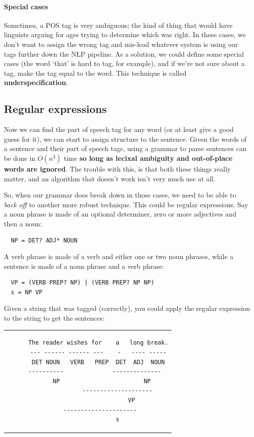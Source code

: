 \paragraph{Special cases} Sometimes, a POS tag is very ambiguous; the kind of
thing that would have linguists arguing for ages trying to determine which was
right. In these cases, we don't want to assign the wrong tag and mis-lead
whatever system is using our tags further down the NLP pipeline. As a solution,
we could define some special cases (the word `that' is hard to tag, for
example), and if we're not sure about a tag, make the tag equal to the word.
This technique is called \textbf{underspecification}.

\subsection{Regular expressions}

Now we can find the part of speech tag for any word (or at least give a good
guess for it), we can start to assign structure to the sentence. Given the words
of a sentence and their part of speech tags, using a grammar to parse sentences
can be done in $O(n^3)$ time \textbf{so long as lecixal ambiguity and
out-of-place words are ignored}. The trouble with this, is that both these
things really matter, and an algorithm that doesn't work isn't very much use
at all.

So, when our grammar does break down in those cases, we need to be able to
\textit{back off} to another more robust technique. This could be regular
expressions. Say a noun phrase is made of an optional determiner, zero or more
adjectives and then a noun:

\begin{verbatim}
  NP = DET? ADJ* NOUN
\end{verbatim}

A verb phrase is made of a verb and either one or two noun phrases, while a
sentence is made of a noun phrase and a verb phrase:

\begin{verbatim}
  VP = (VERB PREP? NP) | (VERB PREP? NP NP)
  s = NP VP
\end{verbatim}

Given a string that was tagged (correctly), you could apply the regular
expression to the string to get the sentences:

\begin{center}
  \begin{tabular}{c}
    \begin{lstlisting}
      The reader wishes for    a   long break.
      --- ------ ------ ---    -   ---- -----
      DET NOUN   VERB   PREP  DET  ADJ  NOUN
      ----------              --------------  
        NP                        NP
                 --------------------
                         VP
       ---------------------
                 s
    \end{lstlisting}
  \end{tabular}
\end{center}

